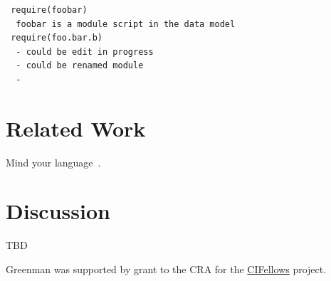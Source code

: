 \documentclass[acmsmall,review,anonymous]{acmart}
\begin{document}
\begin{verbatim}
 require(foobar)
  foobar is a module script in the data model
 require(foo.bar.b)
  - could be edit in progress
  - could be renamed module
  - 
\end{verbatim}



\section{Related Work}
\label{s:related}

Mind your language~\cite{mfk-onward-2011}.


\section{Discussion}
\label{s:conclusion}
\label{s:discussion}



\begin{acks}
  TBD

Greenman was supported by
   grant
 \href{"https://www.nsf.gov/awardsearch/showAward?AWD_ID=2030859"}{}
  to the CRA for the \href{https://cifellows2020.org}{CIFellows} project.
\end{acks}



\end{document}

